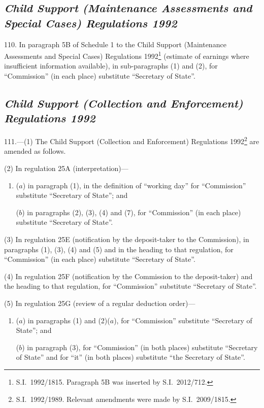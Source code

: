 \documentclass[12pt,a4paper]{article}
\begin{document}
\renewcommand\parthead{--- Schedule Part II}

\subsection*{\itshape Child Support (Maintenance Assessments and Special Cases) Regulations 1992}

110.  In paragraph 5B of Schedule 1 to the Child Support (Maintenance Assessments and Special Cases) Regulations 1992\footnote{S.I.~1992/1815. Paragraph 5B was inserted by S.I.~2012/712.} (estimate of earnings where insufficient information available), in sub-paragraphs (1) and (2), for “Commission” (in each place) substitute “Secretary of State”.

\subsection*{\itshape Child Support (Collection and Enforcement) Regulations 1992}

111.---(1)  The Child Support (Collection and Enforcement) Regulations 1992\footnote{S.I.~1992/1989. Relevant amendments were made by S.I.~2009/1815.} are amended as follows.

(2) In regulation 25A (interpretation)—
\begin{enumerate}\item[]
($a$) in paragraph (1), in the definition of “working day” for “Commission” substitute “Secretary of State”; and

($b$) in paragraphs (2), (3), (4) and (7), for “Commission” (in each place) substitute “Secretary of State”.
\end{enumerate}

(3) In regulation 25E (notification by the deposit-taker to the Commission), in paragraphs (1), (3), (4) and (5) and in the heading to that regulation, for “Commission” (in each place) substitute “Secretary of State”.

(4) In regulation 25F (notification by the Commission to the deposit-taker) and the heading to that regulation, for “Commission” substitute “Secretary of State”.

(5) In regulation 25G (review of a regular deduction order)—
\begin{enumerate}\item[]
($a$) in paragraphs (1) and (2)($a$), for “Commission” substitute “Secretary of State”; and

($b$) in paragraph (3), for “Commission” (in both places) substitute “Secretary of State” and for “it” (in both places) substitute “the Secretary of State”.
\end{enumerate}
\end{document}
